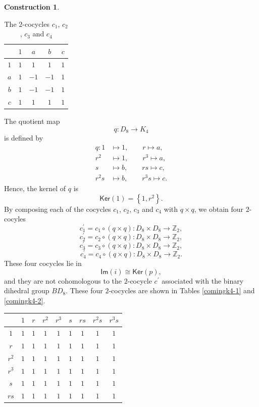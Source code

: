 \documentclass{article}
\theoremstyle{plain}
\theoremstyle{definition}
\newtheorem{const}[thm]{Construction}
\begin{document}
\begin{const}
\begin{table}[H]
\begin{tabular}{ c | c   c   c   c}
& $1$ & $a$ & $b$ & $c$ \\
\hline
$1$ & $1$ & $1$ & $1$ & $1$ \\
$a$ & $1$ & $-1$ & $-1$ & $1$ \\
$b$ & $1$ & $-1$ & $-1$ & $1$ \\
$c$ & $1$ & $1$ & $1$ & $1$
\end{tabular}
\caption{The $2$-cocycles $c_1$, $c_2$, $c_3$ and $c_4$}
\label{k4abext}
\end{table}
The quotient map $$q:D_8 \longrightarrow K_4$$ is defined by
\begin{align*}
q:1 & \longmapsto 1, \qquad
r \longmapsto a, \\
r^2 & \longmapsto 1, \qquad
r^3 \longmapsto a, \\
s & \longmapsto b, \qquad
rs \longmapsto c, \\
r^2s & \longmapsto b, \qquad
r^3s \longmapsto c.
\end{align*}
Hence, the kernel of $q$ is
$$\mathsf{Ker}(1) = \left\{1, r^2\right\}.$$
By composing each of the cocycles $c_1$, $c_2$, $c_3$ and $c_4$ with $q \times q$, we obtain four $2$-cocyles
$$c^\prime_1 = c_1 \circ (q \times q):D_8 \times D_8 \longrightarrow \mathbb{Z}_2,$$
$$c^\prime_2 = c_2 \circ (q \times q):D_8 \times D_8 \longrightarrow \mathbb{Z}_2,$$
$$c^\prime_3 = c_3 \circ (q \times q):D_8 \times D_8 \longrightarrow \mathbb{Z}_2,$$
$$c^\prime_4 = c_4 \circ (q \times q):D_8 \times D_8 \longrightarrow \mathbb{Z}_2.$$
These four cocycles lie in $$\mathsf{Im}(i) \cong \mathsf{Ker}(p),$$
and they are not cohomologous to the $2$-cocycle $c^\prime$ associated with the binary dihedral group $BD_8$.
These four $2$-cocycles are shown in Tables \ref{comingk4-1} and \ref{comingk4-2}.
\begin{table}[H]
\centering
\begin{tabular}{ c | c   c   c   c   c   c   c   c}
& $1$ & $r$ & $r^2$ & $r^3$ & $s$ & $rs$ & $r^2s$ & $r^3s$ \\
\hline
$1$ & $1$ & $1$ & $1$ & $1$ & $1$ & $1$ & $1$ & $1$ \\
$r$ & $1$ & $1$ & $1$ & $1$ & $1$ & $1$ & $1$ & $1$ \\
$r^2$ & $1$ & $1$ & $1$ & $1$ & $1$ & $1$ & $1$ & $1$ \\
$r^3$ & $1$ & $1$ & $1$ & $1$ & $1$ & $1$ & $1$ & $1$ \\
$s$ & $1$ & $1$ & $1$ & $1$ & $1$ & $1$ & $1$ & $1$ \\
$rs$ & $1$ & $1$ & $1$ & $1$ & $1$ & $1$ & $1$ & $1$ \\

\end{tabular}
\end{table}
\end{const}
\end{document}
